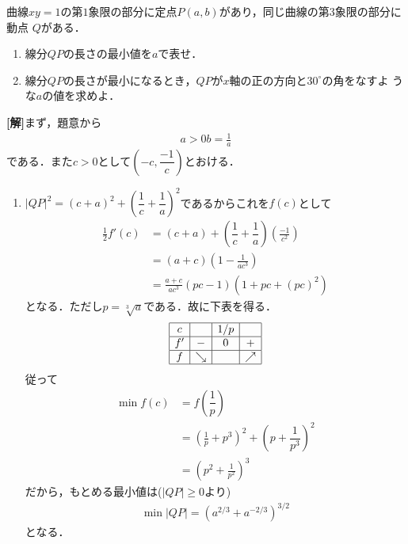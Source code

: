 \documentclass[a4j]{jarticle}
\begin{document}

     \begin{oframed}
     曲線$xy=1$の第$1$象限の部分に定点$P(a,b)$があり，同じ曲線の第$3$象限の部分に動点
     $Q$がある．
          \begin{enumerate}[(1)]
          \item 線分$QP$の長さの最小値を$a$で表せ．
          \item 線分$QP$の長さが最小になるとき，$QP$が$x$軸の正の方向と$30^\circ$の角をなすよ
          うな$a$の値を求めよ．
          \end{enumerate}
     \end{oframed}

\setlength{\columnseprule}{0.4pt}
\begin{multicols}{2}
{\bf[解]}まず，題意から
     \begin{align}
     a>0
     b=\frac{1}{a}
     \end{align}
である．また$c>0$として$\left(-c,\dfrac{-1}{c}\right)$とおける．
     \begin{enumerate}[(1)]
     \item $|QP|^2=(c+a)^2+\left(\dfrac{1}{c}+\dfrac{1}{a}\right)^2$であるからこれを$f(c)$として
          \begin{align*}
          \frac{1}{2}f'(c)&=(c+a)+\left(\dfrac{1}{c}+\dfrac{1}{a}\right)\left(\frac{-1}{c^2}\right)  \\
          &=(a+c)\left(1-\frac{1}{ac^3}\right)  \\
          &=\frac{a+c}{ac^3}{(pc-1)\left(1+pc+(pc)^2\right)}
          \end{align*}
     となる．ただし$p=\sqrt[3]{a}$である．故に下表を得る．
          \begin{align*}
               \begin{array}{|c|c|c|c|} \hline
               c  &   &  1/p   &      \\ \hline
               f'  & - &   0     & +     \\ \hline
               f  &\searrow&         &\nearrow  \\ \hline
               \end{array}
          \end{align*}
     従って
          \begin{align*}
          \min f(c)&=f\left(\dfrac{1}{p}\right) \\
          &=\left(\frac{1}{p}+p^3\right)^2+\left(p+\dfrac{1}{p^3}\right)^2  \\
          &=\left(p^2+\frac{1}{p^2}\right)^3
          \end{align*}
     だから，もとめる最小値は($|QP|\ge0$より)
          \begin{align*}
          \min|QP|=(a^{2/3}+a^{-2/3})^{3/2} \tag{答}
          \end{align*}
     となる．      
     

\end{enumerate}
\end{multicols}
\end{document}
